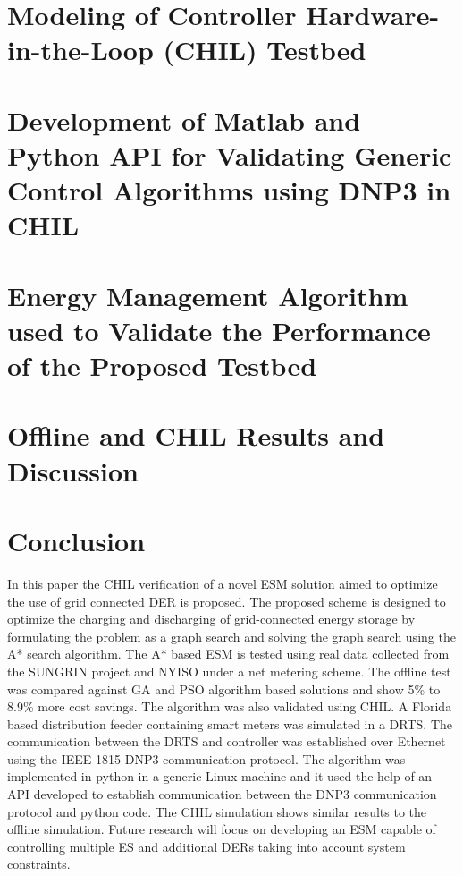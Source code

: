 \documentclass[journal]{IEEEtran}
\begin{document}
\section{Modeling of Controller Hardware-in-the-Loop (CHIL) Testbed} \label{SEC:TB}





\section{Development of Matlab and Python API for Validating Generic Control Algorithms using DNP3 in CHIL}\label{SEC:API_DNM3}



\section{Energy Management Algorithm used to Validate the Performance of the Proposed Testbed}


\section{Offline and CHIL Results and Discussion}





\section{Conclusion}
In this paper the CHIL verification of a novel ESM solution aimed to optimize the use of grid connected DER is proposed. The proposed scheme is designed to optimize the charging and discharging of grid-connected energy storage by formulating the problem as a graph search and solving the graph search using the A* search algorithm. The A* based ESM is tested using real data collected from the SUNGRIN project and NYISO under a net metering scheme. The offline test was compared against GA and PSO algorithm based solutions and show 5\% to 8.9\% more cost savings. The algorithm was also validated using CHIL. A Florida based distribution feeder containing smart meters was simulated in a DRTS. The communication between the DRTS and controller was established over Ethernet using the IEEE 1815 DNP3 communication protocol. The algorithm was implemented in python in a generic Linux machine and it used the help of an API developed to establish communication between the DNP3 communication protocol and python code. The CHIL simulation shows similar results to the offline simulation. Future research will focus on developing an ESM capable of controlling multiple ES and additional DERs taking into account system constraints.
\end{document}
